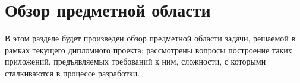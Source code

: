 \section{Обзор предметной области}
\label{sec:domain}

В этом разделе будет произведен обзор предметной области задачи, решаемой в рамках текущего дипломного проекта; рассмотрены вопросы построение таких приложений, предъявляемых требований к ним, сложности, с которыми сталкиваются в процессе разработки.


